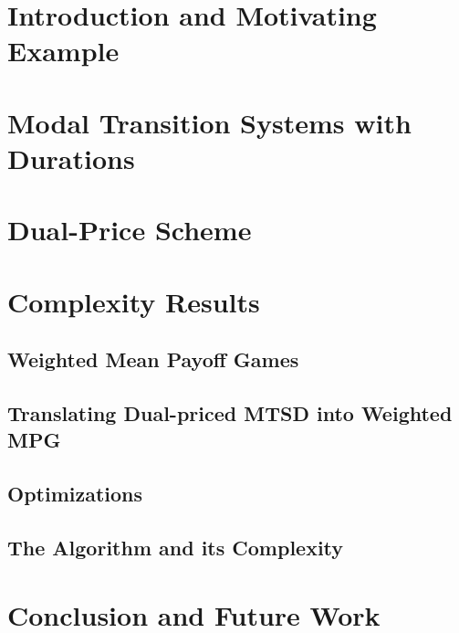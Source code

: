 \section{Introduction and Motivating Example}

\section{Modal Transition Systems with Durations}\label{bmts}

\section{Dual-Price Scheme}\label{prices}

\section{Complexity Results}\label{complexity}

\subsection{Weighted Mean Payoff Games}\label{mpgd}

\subsection{Translating Dual-priced MTSD into Weighted MPG}\label{translation}


	\subsection{Optimizations}\label{opt}
	
	\subsection{The Algorithm and its Complexity}\label{alg}
	


	\section{Conclusion and Future Work}\label{concl}
	